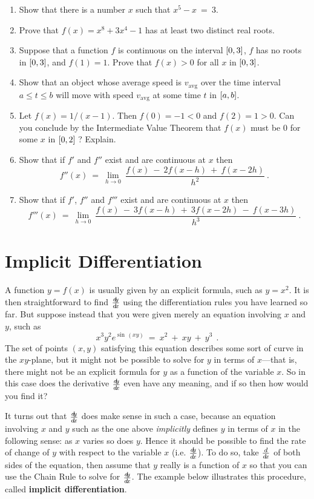 {\begin{enumerate}[\bfseries 1.]
  maximum value and a minimum value in that interval? If so, then give an
  example; if not then explain why.
 \item Show that there is a number $x$ such that $x^5  - x ~=~ 3$.
 \item Prove that $f(x) = x^8 + 3x^4 - 1$ has at least two distinct real roots.
 \item Suppose that a  function $f$ is continuous on the interval $\lbrack 0,3 \rbrack$,
  $f$ has no roots in $\lbrack 0,3 \rbrack$, and $f(1) = 1$. Prove that $f(x) > 0$ for
  all $x$ in $\lbrack 0,3 \rbrack$.
 \item Show that an object whose average speed is $v_{\text{avg}}$ over the time
  interval $a\le t \le b$ will move with speed $v_{\text{avg}}$ at some time $t$
  in $\lbrack a,b \rbrack$.
 \item Let $f(x) = 1/(x-1)$. Then $f(0) = -1 <0$ and $f(2) = 1 > 0$. Can you
  conclude by the Intermediate Value Theorem that $f(x)$ must be $0$ for some
  $x$ in $\lbrack 0,2 \rbrack\;$? Explain.
 \item Show that if $f'$ and $f''$ exist and are continuous at $x$ then
\[
f''(x) ~=~ \lim_{h \to 0}~\frac{f(x) ~-~ 2 f(x-h) ~+~ f(x-2h)}{h^2} ~.
\]
 \item Show that if $f'$, $f''$ and $f'''$ exist and are continuous at $x$ then
\[
f'''(x) ~=~ \lim_{h \to 0}~\frac{f(x) ~-~ 3 f(x-h) ~+~ 3 f(x-2h) ~-~ f(x-3h)}{h^3} ~.
\]
\end{enumerate}
}
\newpage
\section{Implicit Differentiation}
A function $y = f(x)$ is usually given by an explicit formula, such as
$y = x^2$. It is then straightforward to find $\frac{d\negmedspace y}{d\!x}$ using the differentiation
rules you have learned so far. But suppose instead that you were given merely an
equation involving $x$ and $y$, such as
\[
x^3 y^2 e^{\sin\,(xy)} ~=~ x^2 ~+~ xy ~+~ y^3 ~~.
\]
The set of points $(x,y)$ satisfying this equation describes some sort of curve
in the $xy$-plane, but it might not be possible to solve for $y$ in terms of
$x$---that is, there might not be an explicit formula for $y$ as a function of
the variable $x$. So in this case does the derivative $\frac{d\negmedspace y}{d\!x}$ even have any
meaning, and if so then how would you find it?

It turns out that $\frac{d\negmedspace y}{d\!x}$ does make sense in such a case, because an equation
involving $x$ and $y$ such as the one above
\emph{implicitly} defines $y$ in terms of
$x$ in the following sense: as $x$ varies so
does $y$. Hence it should be possible to find the rate of change of $y$
with respect to the variable $x$ (i.e. $\frac{d\negmedspace y}{d\!x}$). To do so, take $\frac{d}{d\!x}$ of both
sides of the equation, then assume that $y$ really is a function of $x$ so that
you can use the Chain Rule to solve for $\frac{d\negmedspace y}{d\!x}$. The example below illustrates
this procedure, called \textbf{implicit differentiation}.

